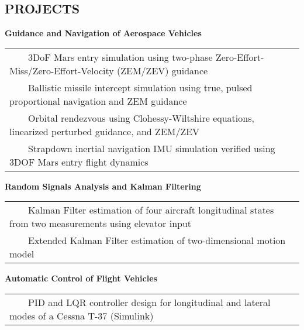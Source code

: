 \documentclass[overlapped, 11pt]{res}
\newcommand{\tabitem}{~~\textbullet~~}
\begin{document}
\begin{resume}
\begin{itemize}
                
         \section{PROJECTS}
                
            \textbf{Guidance and Navigation of Aerospace Vehicles} \\
                \begin{tabular}{l}
                    \tabitem 3DoF Mars entry simulation using two-phase Zero-Effort-Miss/Zero-Effort-Velocity (ZEM/ZEV) guidance\\
                    \tabitem Ballistic missile intercept simulation using true, pulsed proportional navigation and ZEM guidance\\
                    \tabitem Orbital rendezvous using Clohessy-Wiltshire equations, linearized perturbed guidance, and ZEM/ZEV\\
                    \tabitem Strapdown inertial navigation IMU simulation verified using 3DOF Mars entry flight dynamics\\
                \end{tabular}

            \textbf{Random Signals Analysis and Kalman Filtering}\\
                \begin{tabular}{l}
                    \tabitem Kalman Filter estimation of four aircraft longitudinal states from two measurements using elevator input\\
                    \tabitem Extended Kalman Filter estimation of two-dimensional motion model\\
                \end{tabular}
                
            \textbf{Automatic Control of Flight Vehicles}\\
                \begin{tabular}{l}
                    \tabitem PID and LQR controller design for longitudinal and lateral modes of a Cessna T-37 (Simulink)\\
                \end{tabular}
                

\end{itemize}
\end{resume}
\end{document}

